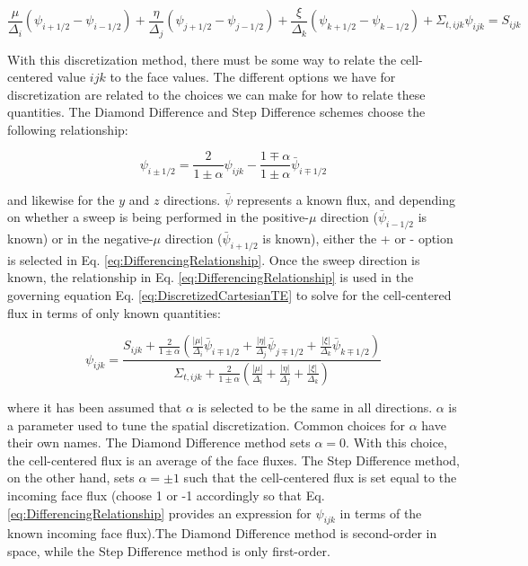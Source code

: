 \documentclass[10pt]{article}
\begin{document}
\begin{equation}
\label{eq:DiscretizedCartesianTE}
\frac{\mu}{\Delta_i}(\psi_{i+1/2}-\psi_{i-1/2})+\frac{\eta}{\Delta_j}(\psi_{j+1/2}-\psi_{j-1/2})+\frac{\xi}{\Delta_k}(\psi_{k+1/2}-\psi_{k-1/2})+\Sigma_{t,ijk}\psi_{ijk}=S_{ijk}
\end{equation}

With this discretization method, there must be some way to relate the cell-centered value \(ijk\) to the face values. The different options we have for discretization are related to the choices we can make for how to relate these quantities. The Diamond Difference and Step Difference schemes choose the following relationship:

\begin{equation}
\label{eq:DifferencingRelationship}
\psi_{i\pm1/2}=\frac{2}{1\pm\alpha}\psi_{ijk}-\frac{1\mp\alpha}{1\pm\alpha}\bar{\psi}_{i\mp1/2}
\end{equation}

and likewise for the \(y\) and \(z\) directions. \(\bar{\psi}\) represents a known flux, and depending on whether a sweep is being performed in the positive-\(\mu\) direction (\(\bar{\psi}_{i-1/2}\) is known) or in the negative-\(\mu\) direction (\(\bar{\psi}_{i+1/2}\) is known), either the + or - option is selected in Eq. \eqref{eq:DifferencingRelationship}. Once the sweep direction is known, the relationship in Eq. \eqref{eq:DifferencingRelationship} is used in the governing equation Eq. \eqref{eq:DiscretizedCartesianTE} to solve for the cell-centered flux in terms of only known quantities:

\begin{equation}
\label{eq:psi_ijk}
\psi_{ijk}=\frac{S_{ijk}+\frac{2}{1\pm\alpha}\left(\frac{|\mu|}{\Delta_i}\bar{\psi}_{i\mp1/2}+\frac{|\eta|}{\Delta_j}\bar{\psi}_{j\mp1/2}+\frac{|\xi|}{\Delta_k}\bar{\psi}_{k\mp1/2}\right)}{\Sigma_{t,ijk}+\frac{2}{1\pm\alpha}\left(\frac{|\mu|}{\Delta_i}+\frac{|\eta|}{\Delta_j}+\frac{|\xi|}{\Delta_k}\right)}
\end{equation}

where it has been assumed that \(\alpha\) is selected to be the same in all directions. \(\alpha\) is a parameter used to tune the spatial discretization. Common choices for \(\alpha\) have their own names. The Diamond Difference method sets \(\alpha=0\). With this choice, the cell-centered flux is an average of the face fluxes. The Step Difference method, on the other hand, sets \(\alpha=\pm1\) such that the cell-centered flux is set equal to the incoming face flux (choose 1 or -1 accordingly so that Eq. \eqref{eq:DifferencingRelationship} provides an expression for \(\psi_{ijk}\) in terms of the known incoming face flux).The Diamond Difference method is second-order in space, while the Step Difference method is only first-order. 
\end{document}
